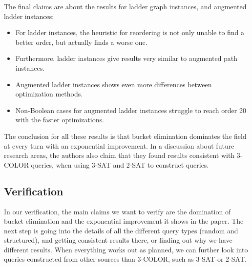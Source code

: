 \noindent The final claims are about the results for ladder graph instances, and augmented ladder instances:
\begin{itemize}
	\item For ladder instances, the heuristic for reordering is not only unable to find a better order, but actually finds a worse one.
	\item Furthermore, ladder instances give results very similar to augmented path instances.
	\item Augmented ladder instances shows even more differences between optimization methods.
	\item Non-Boolean cases for augmented ladder instances struggle to reach order 20 with the faster optimizations.
\end{itemize}

\noindent The conclusion for all these results is that bucket elimination dominates the field at every turn with an exponential improvement. In a discussion about future research areas, the authors also claim that they found results consistent with 3-COLOR queries, when using 3-SAT and 2-SAT to construct queries.

\subsection{Verification}
In our verification, the main claims we want to verify are the domination of bucket elimination and the exponential improvement it shows in the paper. The next step is going into the details of all the different query types (random and structured), and getting consistent results there, or finding out why we have different results. When everything works out as planned, we can further look into queries constructed from other sources than 3-COLOR, such as 3-SAT or 2-SAT.